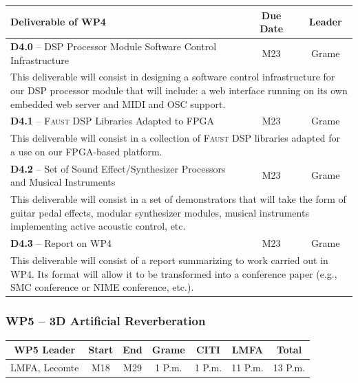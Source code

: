 \documentclass[a4paper,9pt]{extarticle}
\newcommand{\F}{\textsc{Faust}}
\begin{document}
\begin{center}
\begin{tabular}{p{12cm} | c | c}
\textbf{Deliverable of WP4} & \textbf{Due Date} & \textbf{Leader}\\
\hline
\hline
\textbf{D4.0} -- DSP Processor Module Software Control Infrastructure & M23 & Grame\\
\hline
\multicolumn{3}{p{16cm}}{This deliverable will consist in designing a software control infrastructure for our DSP processor module that will include: a web interface running on its own embedded web server and MIDI and OSC support.}\\
\hline
\hline
\textbf{D4.1} -- \F{} DSP Libraries Adapted to FPGA & M23 & Grame\\
\hline
\multicolumn{3}{p{16cm}}{This deliverable will consist in a collection of \F{} DSP libraries adapted for a use on our FPGA-based platform.}\\
\hline
\hline
\textbf{D4.2} -- Set of Sound Effect/Synthesizer Processors and Musical Instruments & M23 & Grame\\
\hline
\multicolumn{3}{p{16cm}}{This deliverable will consist in a set of demonstrators that will take the form of guitar pedal effects, modular synthesizer modules, musical instruments implementing active acoustic control, etc.}\\
\hline
\hline
\textbf{D4.3} -- Report on WP4 & M23 & Grame\\
\hline
\multicolumn{3}{p{16cm}}{This deliverable will consist of a report summarizing to work carried out in WP4. Its format will allow it to be transformed into a conference paper (e.g., SMC conference or NIME conference, etc.).}\\
\end{tabular}
\end{center}

\subsubsection{WP5 -- 3D Artificial Reverberation}
\label{subsubsec:wp5}

\begin{center}
\begin{tabular}{c | c c | c c c | c}
\textbf{WP5 Leader} & \textbf{Start} & \textbf{End} & \textbf{Grame} & \textbf{CITI} & \textbf{LMFA} & \textbf{Total}\\
\hline
LMFA, Lecomte & M18 & M29 & 1 P.m. & 1 P.m. & 11 P.m. & 13 P.m.
\end{tabular}
\end{center}
\end{document}
